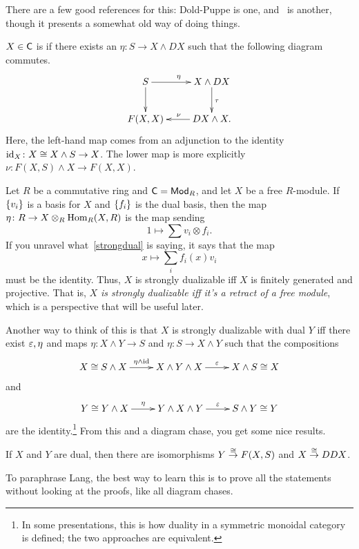 There are a few good references for this: Dold-Puppe is one, and~\cite{LMS} is another, though it presents a
somewhat old way of doing things.
\begin{defn}
$X\in\mathsf C$ is  if there exists an $\eta\colon S\to X\wedge DX$ such that the following
diagram commutes.
\begin{equation}
\label{strongdual}
\begin{gathered}
\xymatrix{
	S\ar[r]^\eta\ar[d] & X\wedge DX\ar[d]^\tau\\
	F(X,X) & DX\wedge X.\ar[l]_\nu
}
\end{gathered}
\end{equation}
Here, the left-hand map comes from an adjunction to the identity $\mathrm{id}_X\colon X\cong X\wedge S\to X$. The lower map
is more explicitly $\nu\colon F(X,S)\wedge X\to F(X,X)$.
\end{defn}
\begin{exm}
Let $R$ be a commutative ring and $\mathsf C = \mathsf{Mod}_R$, and let $X$ be a free $R$-module. If $\{v_i\}$ is a basis for
$X$ and $\{f_i\}$ is the dual basis, then the map $\eta\colon R\to X\otimes_R \operatorname{Hom}_R(X,R)$ is the map sending
\[1\mapsto \sum v_i\otimes f_i.\]
If you unravel what~\eqref{strongdual} is saying, it says that the map
\[x\mapsto \sum_i f_i(x)v_i\]
must be the identity. Thus, $X$ is strongly dualizable iff $X$ is finitely generated and projective. That is,
\emph{$X$ is strongly dualizable iff it's a retract of a free module}, which is a perspective that will be useful
later.
\end{exm}
Another way to think of this is that $X$ is strongly dualizable with dual $Y$ iff there exist $\varepsilon,\eta$ and maps
$\eta\colon X\wedge Y\to S$ and $\eta\colon S\to X\wedge Y$ such that the compositions
\[\xymatrix{
	X\cong S\wedge X\ar[r]^-{\eta\wedge\id} & X\wedge Y\wedge X\ar[r]^-\e & X\wedge S\cong X
}\]
and
\[\xymatrix{
	Y\cong Y\wedge X\ar[r]^-\eta & Y\wedge X\wedge Y\ar[r]^-\e & S\wedge Y\cong Y
}\]
are the identity.\footnote{In some presentations, this is how duality in a symmetric monoidal category is defined;
the two approaches are equivalent.} From this and a diagram chase, you get some nice results.
\begin{prop} %
If $X$ and $Y$ are dual, then there are isomorphisms $Y\stackrel\cong\to F(X,S)$ and $X\stackrel\cong\to DDX$.
\end{prop}
To paraphrase Lang, the best way to learn this is to prove all the statements without looking at the proofs, like
all diagram chases.

